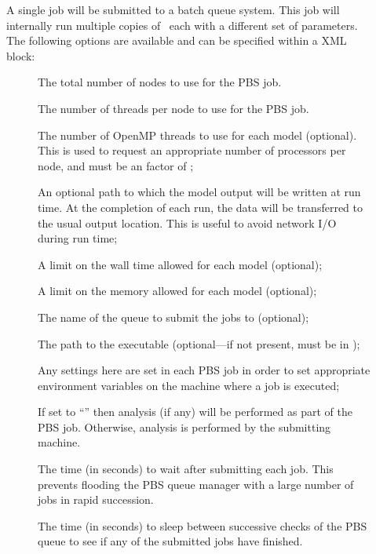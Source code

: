 \begin{description}
\item[] A single job will be submitted to a  batch queue system. This job will internally run multiple copies of \glc\ each with a different set of parameters. The following options are available and can be specified within a  XML block:
\begin{description}
\item[] The total number of nodes to use for the PBS job.
\item[] The number of threads per node to use for the PBS job.
\item[] The number of OpenMP threads to use for each model (optional). This is used to request an appropriate number of processors per node, and must be an factor of ;
\item[] An optional path to which the model output will be written at run time. At the completion of each run, the data will be transferred to the usual output location. This is useful to avoid network I/O during run time;
\item[] A limit on the wall time allowed for each model (optional);
\item[] A limit on the memory allowed for each model (optional);
\item[] The name of the queue to submit the jobs to (optional);
\item[] The path to the  executable (optional---if not present,  must be in );
\item[] Any settings here are set in each {\normalfont \scshape PBS} job in order to set appropriate environment variables on the machine where a job is executed;
\item[] If set to ``'' then analysis (if any) will be performed as part of the PBS job. Otherwise, analysis is performed by the submitting machine.
\item[] The time (in seconds) to wait after submitting each job. This prevents flooding the PBS queue manager with a large number of jobs in rapid succession.
\item[] The time (in seconds) to sleep between successive checks of the PBS queue to see if any of the submitted jobs have finished.
\end{description}


\end{description}
